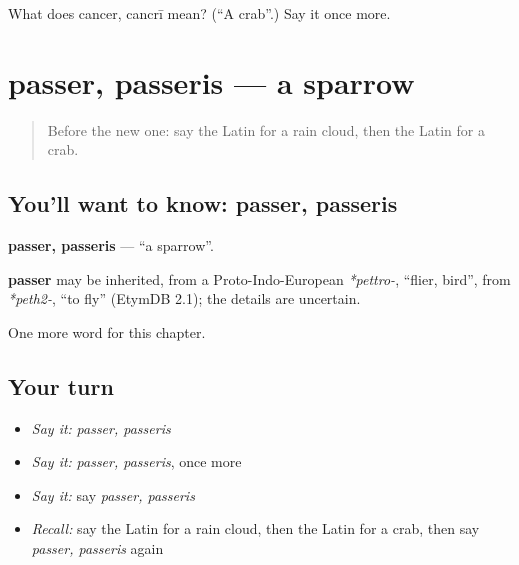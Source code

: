 \begin{tcolorbox}[breakable,colback=teal!4,colframe=teal!35!black,title={Before you move on}]
What does cancer, cancrī mean? (\textquotedblleft{}A crab\textquotedblright{}.) Say it once more.
\end{tcolorbox}
\section[passer, passeris]{passer, passeris — a sparrow}

\label{lesson:LA-C192-passer}



\begin{quote}
Before the new one: say the Latin for a rain cloud, then the Latin for a crab.
\end{quote}

\subsection*{You'll want to know: passer, passeris}
\textbf{passer, passeris} — \textquotedblleft{}a sparrow\textquotedblright{}.

\begin{cousinweb}
\textbf{passer} may be inherited, from a Proto-Indo-European \emph{*pettro-}, \textquotedblleft{}flier, bird\textquotedblright{}, from \emph{*peth2-}, \textquotedblleft{}to fly\textquotedblright{} (EtymDB 2.1); the details are uncertain.
\end{cousinweb}

\begin{grammarlens}[title={What you've built}]
One more word for this chapter.
\end{grammarlens}

\subsection*{Your turn}
\begin{itemize}
\raggedright
  \item \emph{Say it:} \emph{passer, passeris}
  \item \emph{Say it:} \emph{passer, passeris}, once more
  \item \emph{Say it:} say \emph{passer, passeris}
  \item \emph{Recall:} say the Latin for a rain cloud, then the Latin for a crab, then say \emph{passer, passeris} again
\end{itemize}

